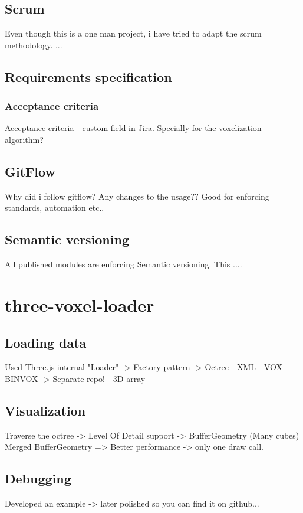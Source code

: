 \subsection{Scrum}
Even though this is a one man project, i have tried to adapt the scrum methodology.
...

\subsection{Requirements specification}
\subsubsection{Acceptance criteria}
Acceptance criteria - custom field in Jira.
Specially for the voxelization algorithm?

\subsection{GitFlow}
Why did i follow gitflow? Any changes to the usage?? Good for enforcing standards, automation etc..

\subsection{Semantic versioning}
All published modules are enforcing Semantic versioning. This ....

\section{three-voxel-loader}
\subsection{Loading data}
Used Three.js internal "Loader" -> Factory pattern -> Octree
- XML
- VOX
- BINVOX -> Separate repo!
- 3D array

\subsection{Visualization}
Traverse the octree -> Level Of Detail support -> BufferGeometry (Many  cubes)
Merged BufferGeometry => Better performance -> only one draw call.
\subsection{Debugging}
Developed an example -> later polished so you can find it on github...

